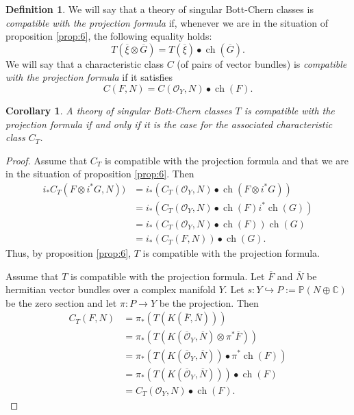 \documentclass[10pt,twoside]{article}
\numberwithin{equation}{section}
\theoremstyle{plain}
\newtheorem{corollary}[equation]{Corollary}
\theoremstyle{definition}
\newtheorem{definition}[equation]{Definition}
\DeclareMathOperator{\ch}{ch}
\begin{document}
\begin{definition}
  We will say that a theory of singular Bott-Chern classes is
  \emph{compatible with the projection formula} if, whenever we are in
  the situation of proposition \ref{prop:6}, the following equality holds:
  \begin{displaymath}
    T(\overline {\xi}\otimes \overline G)=T(\overline {\xi})\bullet
    \ch(\overline G).
  \end{displaymath}
  We will say that a characteristic class $C$ (of pairs of vector bundles)
  is \emph{compatible with the projection formula} if it satisfies
  \begin{displaymath}
     C(F,N)=C(\mathcal{O}_{Y},N)\bullet \ch(F).
  \end{displaymath}
\end{definition}

\begin{corollary} \label{cor:7}
  A theory of singular Bott-Chern classes $T$ is compatible with the
  projection formula if and only if it is the case for the associated characteristic
  class $C_{T}$.
\end{corollary}
\begin{proof}
  Assume that $C_{T}$ is  compatible with the
  projection formula  and that we are in the situation
  of proposition \ref{prop:6}. Then
  \begin{align*}
    i_{\ast}C_{T}(F\otimes i^{\ast}
    G,N))&=i_{\ast}(C_{T}(\mathcal{O}_{Y},N)\bullet
    \ch(F\otimes i^{\ast} 
    G))\\
    &=i_{\ast}(C_{T}(\mathcal{O}_{Y},N)\bullet \ch(F)  i^{\ast}
    \ch(G))\\
    &=i_{\ast}(C_{T}(\mathcal{O}_{Y},N)\bullet \ch(F))
    \ch(G)\\
    &=i_{\ast}(C_{T}(F,N))\bullet \ch(G).
  \end{align*}
  Thus, by proposition \ref{prop:6}, $T$ is compatible with the
  projection formula.

  Assume that $T$ is compatible with the projection formula. Let
  $\overline F$ and $\overline N$ be hermitian vector bundles over a
  complex manifold 
  $Y$. Let $s\colon Y\hookrightarrow P:=\mathbb{P}(N\oplus \mathbb{C})$ be
  the zero section and let $\pi \colon P\longrightarrow Y$ be the
  projection. Then
  \begin{align*}
    C_{T}(F,N)&=\pi _{\ast}(T(K(\overline F,\overline N)))\\
    &=\pi _{\ast}(T(K(\overline {\mathcal{O}}_{Y},\overline N)\otimes
    \pi ^{\ast} \overline F))\\ 
    &=\pi _{\ast}(T(K(\overline {\mathcal{O}}_{Y},\overline N))\bullet
    \pi ^{\ast} 
    \ch(F))\\
    &=\pi _{\ast}(T(K(\overline {\mathcal{O}}_{Y},\overline
    N)))\bullet \ch(F)\\ 
    &=C_{T}(\mathcal{O}_{Y},N)\bullet \ch(F).
  \end{align*}
\end{proof}
\end{document}
